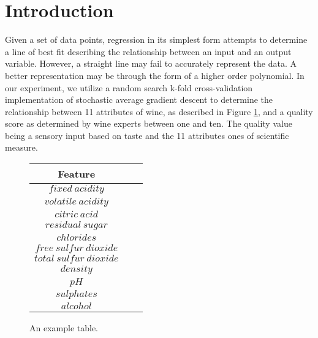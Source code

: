 
\section{Introduction}
\label{sec:intro}

Given a set of data points, regression in its simplest form attempts to 
determine a line of best fit describing the relationship between an
input and an output variable. However, a straight line may fail to
accurately represent the data. A better representation may be through
the form of a higher order polynomial. In our experiment, we utilize
a random search k-fold cross-validation implementation of stochastic
average gradient descent to determine the relationship between 11 attributes of wine,
as described in Figure \ref{tab:attributes}, and a quality score as determined by wine experts
between one and ten. The quality value being a sensory input based on taste
and the 11 attributes ones of scientific measure.



\begin{figure}[htb]
  \centering %

  \begin{tabular}{|c|c|c|} 
    \hline \hline %
    Feature \\ %
    \hline %
    $fixed~acidity$\\
    $volatile~acidity$\\
    $citric~acid$\\
    $residual~sugar$\\
    $chlorides$\\
    $free~sulfur~dioxide$\\
    $total~sulfur~dioxide$\\
    $density$\\
    $pH$\\
    $sulphates$\\
    $alcohol$\\
    \hline \hline
  \end{tabular}

  \caption{An example table.}
  \label{tab:attributes}
\end{figure}

